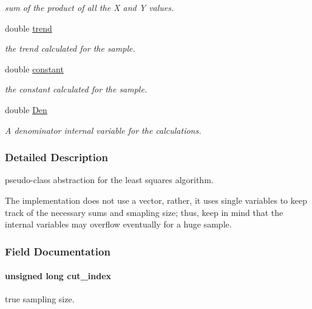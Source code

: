 \begin{DoxyCompactItemize}
\begin{DoxyCompactList}\small\item\em sum of the product of all the X and Y values. \end{DoxyCompactList}\item 
\hypertarget{struct_l_s_r_a16a2f579191db59d0a637f17b67172ce}{double \hyperlink{struct_l_s_r_a16a2f579191db59d0a637f17b67172ce}{trend}}\label{struct_l_s_r_a16a2f579191db59d0a637f17b67172ce}

\begin{DoxyCompactList}\small\item\em the trend calculated for the sample. \end{DoxyCompactList}\item 
\hypertarget{struct_l_s_r_a3d261056ca3667cbc21f0cd453d2d13e}{double \hyperlink{struct_l_s_r_a3d261056ca3667cbc21f0cd453d2d13e}{constant}}\label{struct_l_s_r_a3d261056ca3667cbc21f0cd453d2d13e}

\begin{DoxyCompactList}\small\item\em the constant calculated for the sample. \end{DoxyCompactList}\item 
\hypertarget{struct_l_s_r_a5e5db1686d3b03c302cdc89056d2f323}{double \hyperlink{struct_l_s_r_a5e5db1686d3b03c302cdc89056d2f323}{Den}}\label{struct_l_s_r_a5e5db1686d3b03c302cdc89056d2f323}

\begin{DoxyCompactList}\small\item\em A denominator internal variable for the calculations. \end{DoxyCompactList}\end{DoxyCompactItemize}


\subsubsection{Detailed Description}
pseudo-\/class abstraction for the least squares algorithm.

The implementation does not use a vector, rather, it uses single variables to keep track of the necessary sums and smapling size; thus, keep in mind that the internal variables may overflow eventually for a huge sample. 

\subsubsection{Field Documentation}
\hypertarget{struct_l_s_r_ae625e50c2d72528752732fde73696e9c}{
\paragraph[{cut\+\_\+index}]{\setlength{\rightskip}{0pt plus 5cm}unsigned long cut\+\_\+index}}\label{struct_l_s_r_ae625e50c2d72528752732fde73696e9c}
true sampling size.

